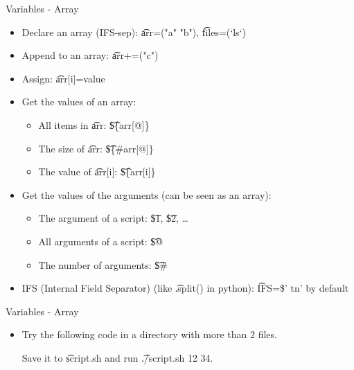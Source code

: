 \begin{frame}[fragile]{Variables - Array}
\begin{multicols}{2}
\begin{itemize}
\item Declare an array (IFS-sep): \t{arr=("a" "b")}, \t{files=(`ls`)}
\item Append to an array: \t{arr+=("c")}
\item Assign: \t{arr[i]=value}
\item Get the values of an array:
\begin{itemize}
\item All items in \t{arr}: \t{\$\{arr[@]\}}
\item The size of \t{arr}: \t{\$\{\#arr[@]\}}
\item The value of \t{arr[i]}: \t{\$\{arr[i]\}}
\end{itemize}
\item Get the values of the arguments (can be seen as an array):
\begin{itemize}
\item The argument of a script: \t{\$1}, \t{\$2}, \dots
\item All arguments of a script: \t{\$@}
\item The number of arguments: \t{\$\#}
\end{itemize}
\item IFS (Internal Field Separator) (like \t{.split()} in python): \t{IFS=\$' tn'} by default
\end{itemize}
\end{multicols}
\end{frame}

\begin{frame}[fragile]{Variables - Array}
\begin{itemize}
\item Try the following code in a directory with more than 2 files.

Save it to \t{script.sh} and run \t{./script.sh 12 34}.
\end{itemize}
\end{frame}


